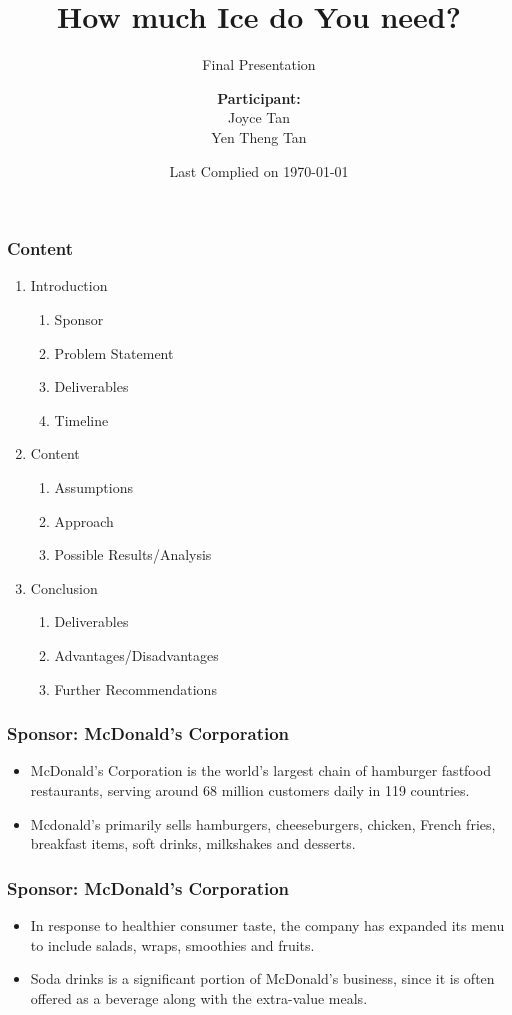 \documentclass[compress,handout,10pt]{beamer}
\title{{\color{blue} \LARGE How much Ice do You need?\newline} }
\subtitle{{\color{red} \large Final Presentation} }
\author{ 
    {\bf{Participant:}} \\ 
Joyce Tan \\ 
Yen Theng Tan \\
    \vspace{5pt}
}
\institute{JHU AMS 2012 FALL}
\date{\mygreen Last Complied on \today}
\let\olditem\item
\renewcommand{\item}{\setlength{\itemsep}{0.5\baselineskip}\olditem}
\begin{document}
\begin{frame}[plain]
    \titlepage
\end{frame}


\begin{frame}
    \frametitle{Content}
    
    \vspace{7pt}
             \begin{enumerate}
                 \item Introduction
 		 \begin{enumerate}
                	 \item Sponsor
		\item Problem Statement
		\item Deliverables
\item Timeline
		\end{enumerate}
                 \item Content
		\begin{enumerate}
\item Assumptions
                	 \item Approach
		\item Possible Results/Analysis
		\end{enumerate}
                 \item Conclusion
		\begin{enumerate}
                	 \item Deliverables
		\item Advantages/Disadvantages
		\item Further Recommendations
		\end{enumerate}
             \end{enumerate}
\end{frame}

\begin{frame}
    \frametitle{Sponsor: McDonald's Corporation}
    \begin{itemize}
        \item McDonald's Corporation is the world's largest chain of hamburger fastfood restaurants, serving around 68 million customers daily in 119 countries. 
	\item Mcdonald's primarily sells hamburgers, cheeseburgers, chicken, French fries, breakfast items, soft drinks, milkshakes and desserts. 
    \end{itemize}
\end{frame}

\begin{frame}
    \frametitle{Sponsor: McDonald's Corporation}
    \begin{itemize}
         	\item In response to healthier consumer taste, the company has expanded its menu to include salads, wraps, smoothies and fruits.
	 \item Soda drinks is a significant portion of McDonald's business, since it is often offered as a beverage along with the extra-value meals.
    \end{itemize}
\end{frame}
\end{document}
